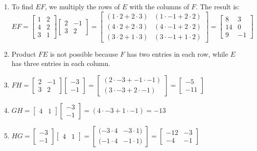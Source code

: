 \begin{solution}


    \begin{enumerate}
        \item To find $EF$, we multiply the rows of $E$ with the columns of $F$. The result is:
              \[
                  EF = \begin{bmatrix} 1 & 2 \\ 4 & 2 \\ 3 & 1 \end{bmatrix} \begin{bmatrix} 2 & -1 \\ 3 & 2 \end{bmatrix} = \begin{bmatrix} (1 \cdot 2 + 2 \cdot 3) & (1 \cdot -1 + 2 \cdot 2) \\ (4 \cdot 2 + 2 \cdot 3) & (4 \cdot -1 + 2 \cdot 2) \\ (3 \cdot 2 + 1 \cdot 3) & (3 \cdot -1 + 1 \cdot 2) \end{bmatrix} = \begin{bmatrix} 8 & 3 \\ 14 & 0 \\ 9 & -1 \end{bmatrix}
              \]
        \item Product $FE$ is not possible because $F$ has two entries in each row, while $E$ has three entries in each column.
        \item $FH = \begin{bmatrix} 2 & -1 \\ 3 & 2 \end{bmatrix} \begin{bmatrix} -3 \\ -1 \end{bmatrix} = \begin{bmatrix} (2 \cdot -3 + -1 \cdot -1) \\ (3 \cdot -3 + 2 \cdot -1) \end{bmatrix} = \begin{bmatrix} -5 \\ -11 \end{bmatrix}$
        \item $GH = \begin{bmatrix} 4 & 1 \end{bmatrix} \begin{bmatrix} -3 \\ -1 \end{bmatrix} = (4 \cdot -3 + 1 \cdot -1) = -13$
        \item $HG = \begin{bmatrix} -3 \\ -1 \end{bmatrix} \begin{bmatrix} 4 & 1 \end{bmatrix} = \begin{bmatrix} (-3 \cdot 4 & -3 \cdot 1) \\ (-1 \cdot 4 & -1 \cdot 1) \end{bmatrix} = \begin{bmatrix} -12 & -3 \\ -4 & -1 \end{bmatrix}$

\end{enumerate}
\end{solution}
